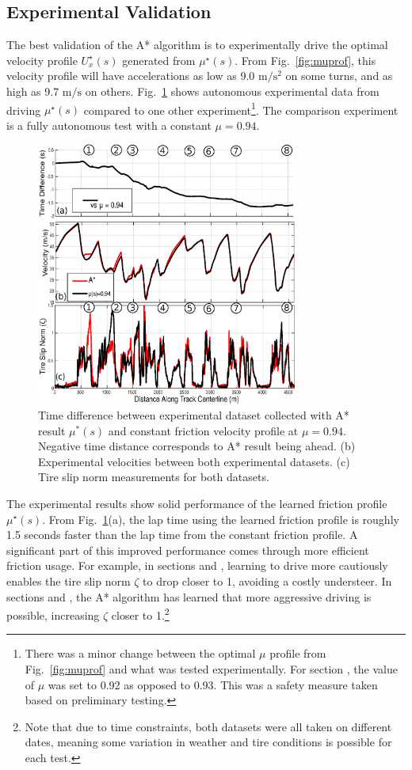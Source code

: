 \documentclass[9pt,shortpaper,twoside,web]{ieeecolor}
\newcommand*\circled[1]{\tikz[baseline=(char.base)]{
            \node[shape=circle,draw,inner sep=2pt] (char) {#1};}}
\begin{document}
{{{\subsection{Experimental Validation}
The best validation of the A* algorithm is to experimentally drive the optimal velocity profile $U^\star_x(s)$ generated from $\mu^\star(s)$. From Fig.~\ref{fig:muprof}, this velocity profile will have accelerations as low as 9.0 $\mathrm{m/s^2}$ on some turns, and as high as 9.7 $\mathrm{m/s}$ on others. Fig.~\ref{fig:muexpres} shows autonomous experimental data from 
driving $\mu^\star(s)$ compared to one other experiment\footnote{There was a minor change between the optimal $\mu$ profile from Fig.~\ref{fig:muprof} and what was tested experimentally. For section \circled{2}, the value of $\mu$ was set to 0.92 as opposed to 0.93. This was a safety measure taken based on preliminary testing.}. The comparison experiment is a fully autonomous test with a constant $\mu = 0.94$.

\begin{figure}[tb]
\centering
\includegraphics[width=3.4in]{figures/expAstarResults.eps}
\caption{Time difference between experimental dataset collected with A* result $\mu^*(s)$ and constant friction velocity profile at $\mu = 0.94$. Negative time distance corresponds to A* result being ahead. (b) Experimental velocities between both experimental datasets.
(c) Tire slip norm measurements for both datasets.}
\label{fig:muexpres}
\end{figure}  

 The experimental results show solid performance of the learned friction profile $\mu^\star(s)$. From Fig.~\ref{fig:muexpres}(a), the lap time using the learned friction profile is roughly 1.5 seconds faster than the lap time from the constant friction profile. A significant part of this improved performance comes through more efficient friction usage.
 For example, in sections \circled{2} and \circled{8}, learning to drive more cautiously enables the tire slip norm $\zeta$ to drop closer to 1, avoiding
 a costly understeer. In sections \circled{3} and \circled{7}, the A* algorithm has learned that more aggressive driving is possible, increasing $\zeta$ closer to 1.\footnote{Note that due to time constraints, both datasets were all taken on different dates, meaning some variation in weather and tire conditions is possible for each test.} 

}}}
\end{document}
